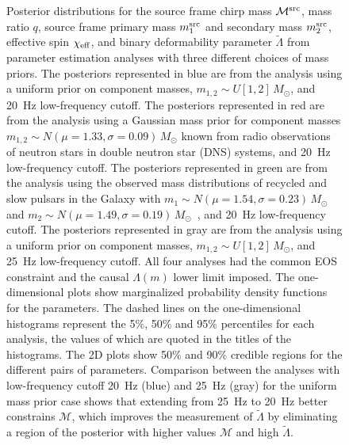 \begin{figure}
\begin{adjustwidth}{-1.5cm}{-0.8cm}
  \caption{\footnotesize Posterior distributions for the source frame chirp mass $\mathcal{M}^{\rm src}$, mass ratio $q$, source frame primary mass $m_1^{\rm src}$ and secondary mass $m_2^{\rm src}$, effective spin $\chi_{\rm eff}$, and binary deformability parameter $\tilde{\Lambda}$ from parameter estimation analyses with three different choices of mass priors. The posteriors represented in blue are from the analysis using a uniform prior on component masses, $m_{1,2} \sim U[1,2]\, M_\odot$, and 20~Hz low-frequency cutoff. The posteriors represented in red are from the analysis using a Gaussian mass prior for component masses $m_{1,2} \sim N(\mu = 1.33, \sigma = 0.09)\, M_\odot$ known from radio observations of neutron stars in double neutron star (DNS) systems, and 20~Hz low-frequency cutoff. The posteriors represented in green are from the analysis using the observed mass distributions of recycled and slow pulsars in the Galaxy with $m_1 \sim N(\mu = 1.54, \sigma = 0.23)\, M_\odot$ and $m_2 \sim N(\mu = 1.49, \sigma = 0.19)\, M_\odot$~\cite{Ozel:2016oaf}, and 20~Hz low-frequency cutoff. The posteriors represented in gray are from the analysis using a uniform prior on component masses, $m_{1,2} \sim U[1,2]\, M_\odot$, and 25~Hz low-frequency cutoff. All four analyses had the common EOS constraint and the causal $\Lambda(m)$ lower limit imposed. The one-dimensional plots show marginalized probability density functions for the parameters. The dashed lines on the one-dimensional histograms represent the 5$\%$, 50$\%$ and 95$\%$ percentiles for each analysis, the values of which are quoted in the titles of the histograms. The 2D plots show 50$\%$ and 90$\%$ credible regions for the different pairs of parameters. Comparison between the analyses with low-frequency cutoff 20~Hz (blue) and 25~Hz (gray) for the uniform mass prior case shows that extending from 25~Hz to 20~Hz better constrains $\mathcal{M}$, which improves the measurement of $\tilde\Lambda$ by eliminating a region of the posterior with higher values $\mathcal{M}$ and high $\tilde\Lambda$.
  \label{fig:posterior_overlap}}
\end{adjustwidth}
\end{figure}

